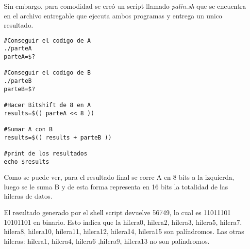 \documentclass[8pt,letterpapper]{article}
\begin{document}
Sin embargo, para comodidad se creó un script llamado \textit{palin.sh} que se encuentra en el archivo entregable que ejecuta ambos programas y entrega un unico resultado.
\begin{lstlisting}
#Conseguir el codigo de A
./parteA
parteA=$?

#Conseguir el codigo de B
./parteB
parteB=$?

#Hacer Bitshift de 8 en A
results=$(( parteA << 8 ))

#Sumar A con B
results=$(( results + parteB ))

#print de los resultados
echo $results
\end{lstlisting}
Como se puede ver, para el resultado final se corre A en 8 bits a la izquierda, luego se le suma B y de esta forma representa en 16 bits la totalidad de las hileras de datos.

El resultado generado por el shell script devuelve 56749, lo cual es 11011101 10101101 en binario. Esto indica que la hilera0, hilera2, hilera3, hilera5, hilera7, hilera8, hilera10, hilera11, hilera12, hilera14, hilera15 son palíndromos. Las otras hileras: hilera1, hilera4, hilera6 ,hilera9, hilera13 no son palíndromos.
\end{document}
